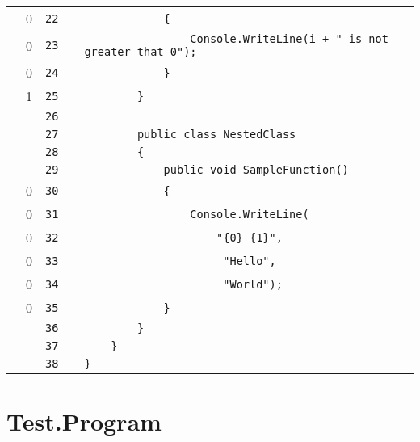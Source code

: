 \documentclass[a4paper,landscape,10pt]{article}
\begin{document}
\begin{longtable}[l]{lrrll}
\cellcolor{red} & 0 & \verb~22~ & & \verb~            {~\\
\cellcolor{red} & 0 & \verb~23~ & & \verb~                Console.WriteLine(i + " is not greater that 0");~\\
\cellcolor{red} & 0 & \verb~24~ & & \verb~            }~\\
\cellcolor{green} & 1 & \verb~25~ & & \verb~        }~\\
\cellcolor{gray} &  & \verb~26~ & & \verb~~\\
\cellcolor{gray} &  & \verb~27~ & & \verb~        public class NestedClass~\\
\cellcolor{gray} &  & \verb~28~ & & \verb~        {~\\
\cellcolor{gray} &  & \verb~29~ & & \verb~            public void SampleFunction()~\\
\cellcolor{red} & 0 & \verb~30~ & & \verb~            {~\\
\cellcolor{red} & 0 & \verb~31~ & & \verb~                Console.WriteLine(~\\
\cellcolor{red} & 0 & \verb~32~ & & \verb~                    "{0} {1}",~\\
\cellcolor{red} & 0 & \verb~33~ & & \verb~                     "Hello",~\\
\cellcolor{red} & 0 & \verb~34~ & & \verb~                     "World");~\\
\cellcolor{red} & 0 & \verb~35~ & & \verb~            }~\\
\cellcolor{gray} &  & \verb~36~ & & \verb~        }~\\
\cellcolor{gray} &  & \verb~37~ & & \verb~    }~\\
\cellcolor{gray} &  & \verb~38~ & & \verb~}~\\
\end{longtable}
\newpage
\section{Test.Program}
\end{document}
